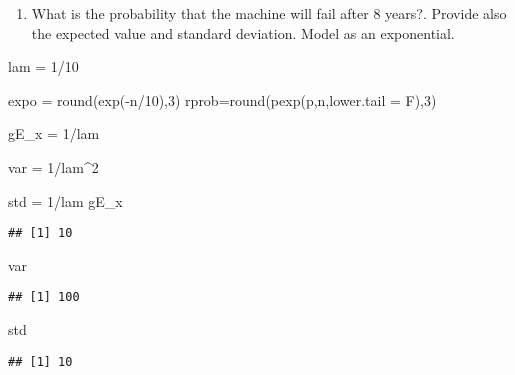\documentclass[
]{article}
\newenvironment{Shaded}{\begin{snugshade}}{\end{snugshade}}
\newcommand{\AttributeTok}[1]{\textcolor[rgb]{0.77,0.63,0.00}{#1}}
\newcommand{\DecValTok}[1]{\textcolor[rgb]{0.00,0.00,0.81}{#1}}
\newcommand{\FunctionTok}[1]{\textcolor[rgb]{0.00,0.00,0.00}{#1}}
\newcommand{\NormalTok}[1]{#1}
\newcommand{\OtherTok}[1]{\textcolor[rgb]{0.56,0.35,0.01}{#1}}
\newcommand{\SpecialCharTok}[1]{\textcolor[rgb]{0.00,0.00,0.00}{#1}}
\providecommand{\tightlist}{%
  \setlength{\itemsep}{0pt}\setlength{\parskip}{0pt}}
\begin{document}
\begin{enumerate}
\def\labelenumi{\alph{enumi}.}
\setcounter{enumi}{1}
\tightlist
\item
  What is the probability that the machine will fail after 8 years?.
  Provide also the expected value and standard deviation. Model as an
  exponential.
\end{enumerate}

\begin{Shaded}
\begin{Highlighting}[]
\NormalTok{lam }\OtherTok{=} \DecValTok{1}\SpecialCharTok{/}\DecValTok{10}

\NormalTok{expo }\OtherTok{=} \FunctionTok{round}\NormalTok{(}\FunctionTok{exp}\NormalTok{(}\SpecialCharTok{{-}}\NormalTok{n}\SpecialCharTok{/}\DecValTok{10}\NormalTok{),}\DecValTok{3}\NormalTok{)}
\NormalTok{rprob}\OtherTok{=}\FunctionTok{round}\NormalTok{(}\FunctionTok{pexp}\NormalTok{(p,n,}\AttributeTok{lower.tail =}\NormalTok{ F),}\DecValTok{3}\NormalTok{)}

\NormalTok{gE\_x }\OtherTok{=} \DecValTok{1}\SpecialCharTok{/}\NormalTok{lam}

\NormalTok{var }\OtherTok{=} \DecValTok{1}\SpecialCharTok{/}\NormalTok{lam}\SpecialCharTok{\^{}}\DecValTok{2}

\NormalTok{std }\OtherTok{=} \DecValTok{1}\SpecialCharTok{/}\NormalTok{lam}
\NormalTok{gE\_x}
\end{Highlighting}
\end{Shaded}

\begin{verbatim}
## [1] 10
\end{verbatim}

\begin{Shaded}
\begin{Highlighting}[]
\NormalTok{var}
\end{Highlighting}
\end{Shaded}

\begin{verbatim}
## [1] 100
\end{verbatim}

\begin{Shaded}
\begin{Highlighting}[]
\NormalTok{std}
\end{Highlighting}
\end{Shaded}

\begin{verbatim}
## [1] 10
\end{verbatim}
\end{document}
